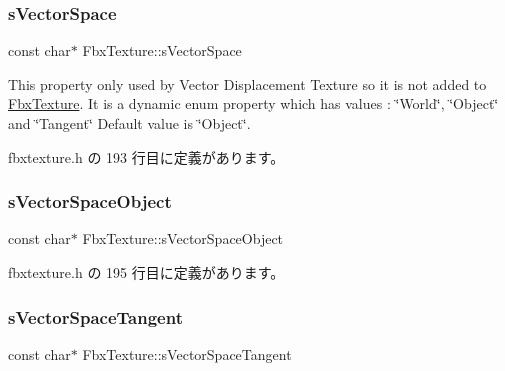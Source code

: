 \mbox{\label{class_fbx_texture_a496d2263bd3423ed99633852d396a50f}} 
\subsubsection{\texorpdfstring{s\+Vector\+Space}{sVectorSpace}}
{\footnotesize\ttfamily const char$\ast$ Fbx\+Texture\+::s\+Vector\+Space\hspace{0.3cm}{\ttfamily [static]}}

This property only used by Vector Displacement Texture so it is not added to \hyperlink{class_fbx_texture}{Fbx\+Texture}. It is a dynamic enum property which has values \+: \char`\"{}\+World\char`\"{}, \char`\"{}\+Object\char`\"{} and \char`\"{}\+Tangent\char`\"{} Default value is \char`\"{}\+Object\char`\"{}. 

 fbxtexture.\+h の 193 行目に定義があります。

\mbox{\label{class_fbx_texture_a4630b513879dd7403cd51fe0efaeb5ca}} 
\subsubsection{\texorpdfstring{s\+Vector\+Space\+Object}{sVectorSpaceObject}}
{\footnotesize\ttfamily const char$\ast$ Fbx\+Texture\+::s\+Vector\+Space\+Object\hspace{0.3cm}{\ttfamily [static]}}



 fbxtexture.\+h の 195 行目に定義があります。

\mbox{\label{class_fbx_texture_a606da961541df60244581084fcba2198}} 
\subsubsection{\texorpdfstring{s\+Vector\+Space\+Tangent}{sVectorSpaceTangent}}
{\footnotesize\ttfamily const char$\ast$ Fbx\+Texture\+::s\+Vector\+Space\+Tangent\hspace{0.3cm}{\ttfamily [static]}}




